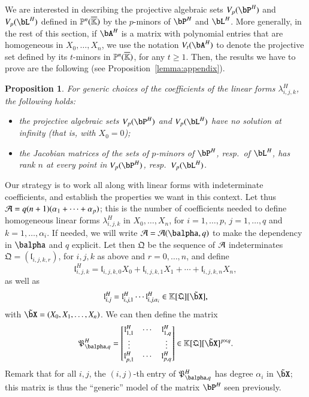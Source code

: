 \documentclass[amsthm]{elsart}
\newtheorem*{propositionnonumber}{Proposition}
\begin{document}
We are interested in describing the projective algebraic sets
$V_p(\bP^H)$ and $V_p(\bL^H)$ defined in $\mathbb{P}^n(\overline{\mathbb{K}})$ by the
$p$-minors of $\bP^H$ and $\bL^H$. More generally, in the rest of this
section, if $\bA^H$ is a matrix with polynomial entries that are
homogeneous in $X_0,\dots,X_n$, we use the notation $V_t(\bA^H)$ to
denote the projective set defined by its $t$-minors in $\mathbb{P}^n(\overline{\mathbb{K}})$,
for any $t\ge 1$. Then, the results we have to prove are the following
(see Proposition~\ref{lemma:appendix}).
\begin{propositionnonumber}\label{lemma:appendix2}
  For generic choices of the coefficients of the linear forms
  $\lambda^H_{i,j,k}$, the following holds:
  \begin{itemize}
  \item the projective algebraic sets $V_p(\bP^H)$ and $V_p(\bL^H)$
    have no solution at infinity (that is, with $X_0=0$);
  \item the Jacobian matrices of the sets of $p$-minors 
    of $\bP^H$, resp.\ of $\bL^H$, has rank $n$ at every point 
    in $V_p(\bP^H)$, resp.\ $V_p(\bL^H)$.
\end{itemize}
\end{propositionnonumber}

Our strategy is to work all along with linear forms with indeterminate
coefficients, and establish the properties we want in this context.
Let thus ${\cal A}=q(n+1)(\alpha_1 + \cdots + \alpha_p)$; this is the
number of coefficients needed to define homogeneous linear forms
$\lambda^H_{i,j,k}$ in $X_0,\dots,X_n$, for $i=1,\dots,p$,
$j=1,\dots,q$ and $k=1,\dots,\alpha_i$. If needed, we will write
${\cal A}={\cal A}(\balpha,q)$ to make the dependency in $\balpha$ and
$q$ explicit.  Let then $\mathfrak{Q}$ be the sequence of ${\cal A}$
indeterminates $\mathfrak{Q}=(\mathfrak{l}_{i,j,k,r})$, for $i,j,k$ as
above and $r=0,\dots,n$, and define
$$\mathfrak{l}^H_{i,j,k} = \mathfrak{l}_{i,j,k,0}X_0 + \mathfrak{l}_{i,j,k,1} X_1 +\cdots + \mathfrak{l}_{i,j,k,n} X_n,$$
as well as 
$$\mathfrak{l}^H_{i,j} = \mathfrak{l}^H_{i,j,1} \cdots \mathfrak{l}^H_{i,j,\alpha_i} \in \KK[\mathfrak{Q}][\tilde\bX],$$
with $\tilde\bX=(X_0,X_1,\dots,X_n)$. We can then define the
matrix
\begin{align}\label{eq:matM}
\mathfrak{P}^H_{\balpha,q}=\left [\begin{matrix}
\mathfrak{l}^H_{1,1} & \cdots & \mathfrak{l}^H_{1,q}\\
 \vdots & & \vdots\\
\mathfrak{l}^H_{p,1} & \cdots & \mathfrak{l}^H_{p,q}
  \end{matrix}\right ]\in \KK[\mathfrak{Q}][\tilde\bX]^{p\times q}.  
\end{align}
Remark that for all $i,j$, the $(i,j)$-th entry of
$\mathfrak{P}^H_{\balpha,q}$ has degree $\alpha_i$ in $\tilde \bX$;
this matrix is thus the ``generic'' model of the matrix $\bP^H$ seen previously.
\end{document}
